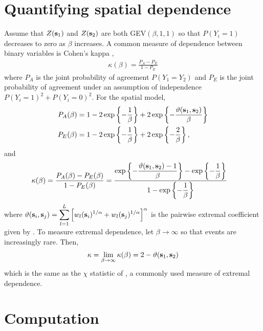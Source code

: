 \section{Quantifying spatial dependence} \label{rbs:spatdep}

Assume that $Z(\mathbf{s}_1)$ and $Z(\mathbf{s}_2)$ are both GEV$(\beta, 1, 1)$ so that $P(Y_i = 1)$ decreases to zero as $\beta$ increases.
A common measure of dependence between binary variables is Cohen's kappa \citep{Cohen1960},
\begin{align}
\kappa(\beta) = \frac{P_A - P_E}{1 - P_E}
\end{align}
where $P_A$ is the joint probability of agreement $P(Y_1 = Y_2)$ and $P_E$ is the joint probability of agreement under an assumption of independence $P(Y_i = 1)^2 + P(Y_i = 0)^2$.
For the spatial model,
\begin{align*}
P_A(\beta) &= 1 - 2 \exp\left\{ -\frac{1}{\beta} \right\} + 2 \exp\left\{-\frac{\vartheta(\mathbf{s}_1, \mathbf{s}_2)}{\beta}  \right\} \nonumber \\
P_E(\beta) &= 1 - 2 \exp \left\{ -\frac{1}{\beta} \right\} + 2 \exp \left\{ -\frac{2}{\beta} \right\}, \nonumber
\end{align*}
and
\begin{align} \label{rbeq:kappa}
\kappa(\beta) &= \frac{P_A(\beta) - P_E(\beta)}{1 - P_E(\beta)} = \frac{\exp\left\{-\displaystyle\frac{\vartheta(\mathbf{s}_1, \mathbf{s}_2) - 1}{\beta}  \right\} - \exp \left\{ -\displaystyle\frac{1}{\beta} \right\}}{1 - \exp \left\{ -\displaystyle\frac{1}{\beta} \right\}}
\end{align}
where $\vartheta (\mathbf{s}_i, \mathbf{s}_j) = \displaystyle \sum_{ l = 1 }^{ L } \left[ w_{l}(\mathbf{s}_i)^{ 1/\alpha } +  w_{ l}(\mathbf{s}_j)^{ 1/\alpha } \right]^\alpha$ is the pairwise extremal coefficient given by \citet{Reich2012}.
To measure extremal dependence, let $\beta \rightarrow \infty$ so that events are increasingly rare.
Then,
\begin{align}
\kappa = \lim_{\beta \rightarrow \infty} \kappa(\beta) = 2 - \vartheta(\mathbf{s}_1, \mathbf{s}_2)
\end{align}
which is the same as the $\chi$ statistic of \citet{Coles2001}, a commonly used measure of extremal dependence.

\section{Computation}\label{rbs:comp}

